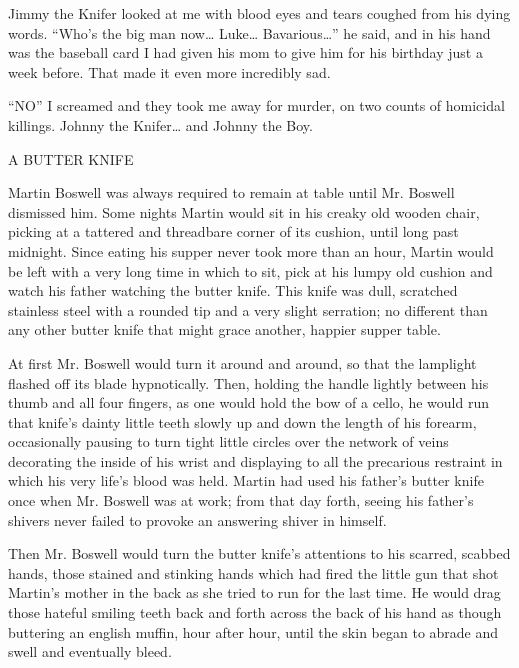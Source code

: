 Jimmy the Knifer looked at me with blood eyes and tears coughed
from his dying words. ``Who's the big man now{\ldots} Luke{\ldots}
Bavarious{\ldots}'' he said, and in his hand was the baseball card I had
given his mom to give him for his birthday just a week before. That
made it even more incredibly sad.



``NO'' I screamed and they took me away for murder, on two counts of
homicidal killings. Johnny the Knifer{\ldots} and Johnny the Boy. 

 





A BUTTER KNIFE





Martin Boswell was always required to remain at table until Mr.
Boswell dismissed him. Some nights Martin would sit in his creaky
old wooden chair, picking at a tattered and threadbare corner of
its cushion, until long past midnight. Since eating his supper
never took more than an hour, Martin would be left with a very long
time in which to sit, pick at his lumpy old cushion and watch his
father watching the butter knife. This knife was dull, scratched
stainless steel with a rounded tip and a very slight serration; no
different than any other butter knife that might grace another,
happier supper table.



At first Mr. Boswell would turn it around and around, so that the
lamplight flashed off its blade hypnotically. Then, holding the
handle lightly between his thumb and all four fingers, as one would
hold the bow of a cello, he would run that knife's dainty little
teeth slowly up and down the length of his forearm, occasionally
pausing to turn tight little circles over the network of veins
decorating the inside of his wrist and displaying to all the
precarious restraint in which his very life's blood was held.
Martin had used his father's butter knife once when Mr. Boswell was
at work; from that day forth, seeing his father's shivers never
failed to provoke an answering shiver in himself.



Then Mr. Boswell would turn the butter knife's attentions to his
scarred, scabbed hands, those stained and stinking hands which had
fired the little gun that shot Martin's mother in the back as she
tried to run for the last time. He would drag those hateful smiling
teeth back and forth across the back of his hand as though
buttering an english muffin, hour after hour, until the skin began
to abrade and swell and eventually bleed.



